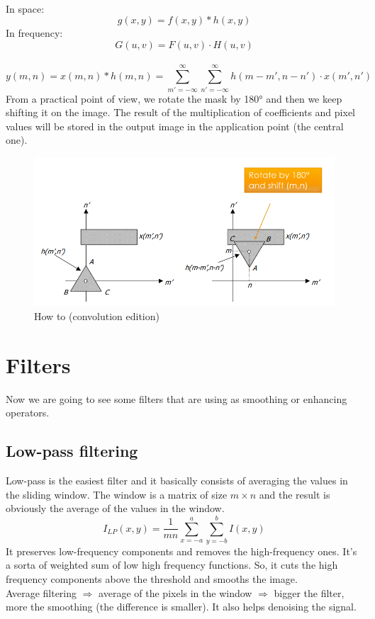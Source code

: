 \\ In space: \[ g(x,y)= f(x,y)*h(x,y) \]
In frequency: \[ G(u,v)= F(u,v) \cdot H(u,v) \]
\\
\[ y(m,n)= x(m,n)*h(m,n) = \sum_{m'=-\infty}^{\infty} \sum_{n'=-\infty}^{\infty} h(m-m',n-n') \cdot x(m',n')\]
From a practical point of view, we rotate the mask by 180° and then we keep shifting it on the image. The result of the multiplication of coefficients and pixel values will be stored in the output image in the application point (the central one).
\begin{figure}[h]
    \centering
    \includegraphics[scale=0.3]{Figures/Convolution.png}
    \caption{How to (convolution edition)}
    \label{fig:enter-label}
\end{figure}

\section{Filters}
Now we are going to see some filters that are using as smoothing or enhancing operators.
\subsection{Low-pass filtering}
Low-pass is the easiest filter and it basically consists of averaging the values in the sliding window. The window is a matrix of size $m \times n$ and the result is obviously the average of the values in the window.
\[
    I_{LP}(x,y) = \frac{1}{mn} \sum_{x=-a}^{a} \sum_{y=-b}^{b} I(x,y)
\]
It preserves low-frequency components and removes the high-frequency ones. It's a sorta of weighted sum of low high frequency functions. So, it cuts the high frequency components above the threshold and smooths the image. 
\\Average filtering $\Rightarrow$ average of the pixels in the window $\Rightarrow$ bigger the filter, more the smoothing (the difference is smaller). It also helps denoising the signal. 

